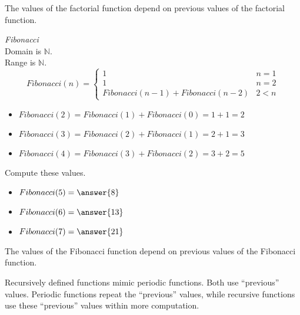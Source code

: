 \documentclass{ximera}
\begin{document}
The values of the factorial function depend on previous values of the factorial function. \\












\begin{example}  \textit{Fibonacci} \\


Domain is $\mathbb{N}$. \\
Range is $\mathbb{N}$. \\



\[
Fibonacci(n) = 
\begin{cases}
  1 & n = 1 \\
  1 & n = 2 \\ 
  Fibonacci(n-1) + Fibonacci(n-2) & 2 < n
\end{cases}
\]


\begin{itemize}
\item $Fibonacci(2) = Fibonacci(1) + Fibonacci(0) = 1 + 1 = 2$
\item $Fibonacci(3) = Fibonacci(2) + Fibonacci(1) = 2 + 1 = 3$
\item $Fibonacci(4) = Fibonacci(3) + Fibonacci(2) = 3 + 2 = 5$
\end{itemize}




\begin{question} Compute these values.


\begin{itemize}
\item $Fibonacci(5) = \answer{8}$
\item $Fibonacci(6) = \answer{13}$
\item $Fibonacci(7) = \answer{21}$
\end{itemize}


\end{question}



\end{example}

The values of the Fibonacci function depend on previous values of the Fibonacci function.





Recursively defined functions mimic periodic functions.  Both use ``previous'' values.  Periodic functions repeat the ``previous'' values, while recursive functions use these ``previous'' values within more computation. \\
\end{document}
